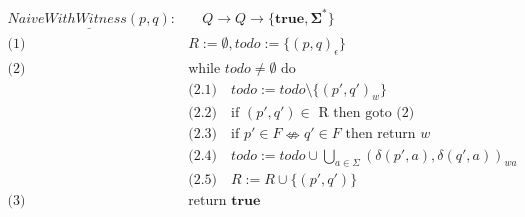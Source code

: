 \begin{definition}
  \begin{align*}
    \underline{\mathit{NaiveWithWitness(p, q)}}: &\quad Q \to Q \to \{\mathbf{true}, \mathbf{\Sigma^\ast}\} \\
    \text{(1) } & R := \emptyset, \mathit{todo} := \{(p, q)_\epsilon\} \\
    \text{(2) } & \text{while } \mathit{todo} \neq \emptyset \text{ do}\\
      & \text{(2.1)}\quad \mathit{todo} := \mathit{todo} \setminus \{(p', q')_w\}\\
      & \text{(2.2)}\quad \text{if } (p', q') \in \text{ R} \text{ then goto (2)}\\
      & \text{(2.3)}\quad \text{if } p' \in F \nLeftrightarrow q' \in F \text{ then return } w\\
      & \text{(2.4)}\quad \mathit{todo} := \mathit{todo} \cup \bigcup_{a \in \Sigma}{(\delta(p', a), \delta(q', a))_{wa}}\\
      & \text{(2.5)}\quad R := R \cup \{(p', q')\} \\
    \text{(3) } & \text{return } \mathbf{true}\\
  \end{align*}
\end{definition}
